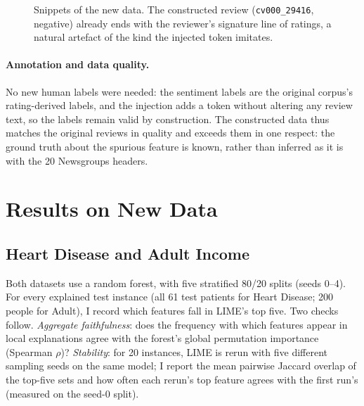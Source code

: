 \documentclass[11pt]{article}
\newcommand{\tok}[1]{\texttt{#1}}
\begin{document}
\begin{figure}[t]
\centering\scriptsize
{}
\caption{Snippets of the new data. The constructed review (\tok{cv000\_29416}, negative) already ends with the reviewer's signature line of ratings, a natural artefact of the kind the injected token imitates.}
\label{fig:newsnippets}
\end{figure}

\paragraph{Annotation and data quality.} No new human labels were needed: the sentiment labels are the original corpus's rating-derived labels, and the injection adds a token without altering any review text, so the labels remain valid by construction. The constructed data thus matches the original reviews in quality and exceeds them in one respect: the ground truth about the spurious feature is known, rather than inferred as it is with the 20 Newsgroups headers.

\section{Results on New Data}
\label{sec:results}

\subsection{Heart Disease and Adult Income}

Both datasets use a random forest, with five stratified 80/20 splits (seeds 0--4). For every explained test instance (all 61 test patients for Heart Disease; 200 people for Adult), I record which features fall in LIME's top five. Two checks follow. \emph{Aggregate faithfulness}: does the frequency with which features appear in local explanations agree with the forest's global permutation importance (Spearman $\rho$)? \emph{Stability}: for 20 instances, LIME is rerun with five different sampling seeds on the same model; I report the mean pairwise Jaccard overlap of the top-five sets and how often each rerun's top feature agrees with the first run's (measured on the seed-0 split).
\end{document}
